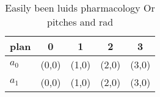 \documentclass[a4paper]{article}
\begin{document}
\begin{table}
\begin{adjustbox}{width=0.7\columnwidth}
\begin{tabular}{|l|l|l|l|l|}
\hline
\textbf{plan} & \multicolumn{1}{c|}{\textbf{0}} & \multicolumn{1}{c|}{\textbf{1}} & \multicolumn{1}{c|}{\textbf{2}} & \multicolumn{1}{c|}{\textbf{3}} \\ \hline
\textbf{$a_0$}  & (0,0) & (1,0) & (2,0) & (3,0) \\ \hline
\textbf{$a_1$}  & (0,0) & (1,0) & (2,0) & (3,0) \\ \hline
\end{tabular}
\end{adjustbox}
\caption{Easily been luids pharmacology Or pitches and rad
}
\end{table}
\end{document}
